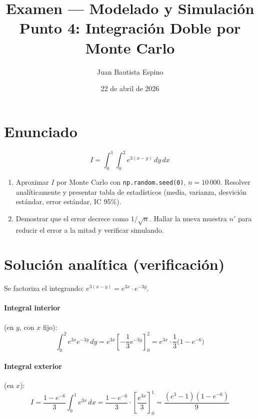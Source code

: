 \documentclass[12pt,a4paper]{article}
\title{\textbf{Examen --- Modelado y Simulaci\'on}\\[0.3em]
       {\large Punto 4: Integraci\'on Doble por Monte Carlo}}
\author{Juan Bautista Espino}
\date{22 de abril de 2026}
\begin{document}
\maketitle\thispagestyle{fancy}

\section*{Enunciado}

\[
  I = \int_0^1 \int_0^2 e^{3(x-y)}\,dy\,dx
\]

\begin{enumerate}
  \item[(a)] Aproximar $I$ por Monte Carlo con \texttt{np.random.seed(0)}, $n=10\,000$.
        Resolver analíticamente y presentar tabla de estad\'isticos (media, varianza,
        desvici\'on est\'andar, error est\'andar, IC 95\%).
  \item[(b)] Demostrar que el error decrece como $1/\sqrt{n}$. Hallar la nueva muestra
        $n'$ para reducir el error a la mitad y verificar simulando.
\end{enumerate}

\section*{Soluci\'on anal\'itica (verificaci\'on)}

Se factoriza el integrando: $e^{3(x-y)} = e^{3x}\cdot e^{-3y}$.

\paragraph{Integral interior} (en $y$, con $x$ fijo):
\[
  \int_0^2 e^{3x}e^{-3y}\,dy
  = e^{3x}\!\left[-\frac{1}{3}e^{-3y}\right]_0^2
  = e^{3x}\cdot\frac{1}{3}\bigl(1 - e^{-6}\bigr)
\]

\paragraph{Integral exterior} (en $x$):
\[
  I = \frac{1-e^{-6}}{3}\int_0^1 e^{3x}\,dx
    = \frac{1-e^{-6}}{3}\cdot\left[\frac{e^{3x}}{3}\right]_0^1
    = \frac{(e^3-1)(1-e^{-6})}{9}
\]
\end{document}
